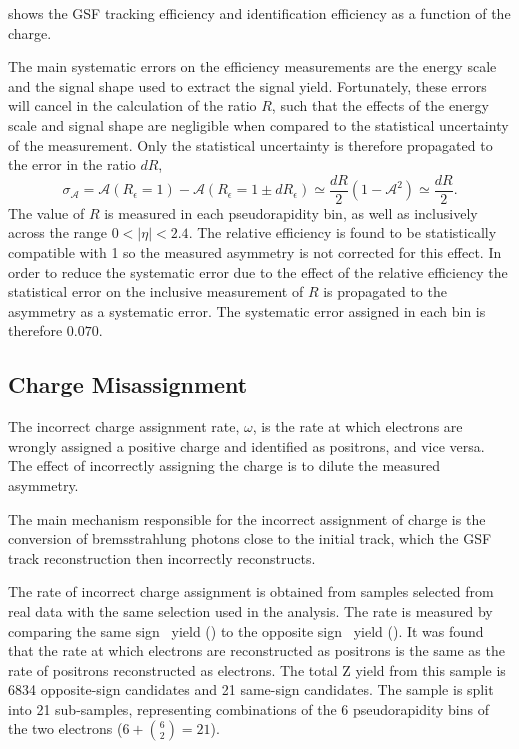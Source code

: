  shows the GSF tracking efficiency and identification 
efficiency as a function of the charge.


The main systematic errors on the efficiency measurements are the energy scale
and the signal shape used to extract the signal yield. Fortunately, these
errors will cancel in the calculation of the ratio $R$, such that the
effects of the energy scale and signal shape are negligible
when compared to the statistical uncertainty of the measurement. Only the
statistical uncertainty is therefore propagated to the error in the ratio
$dR$,
\begin{equation}
  \label{eq:releff}
  \sigma_{\mathcal{A}} 
  = \mathcal{A}(R_\epsilon=1) - \mathcal{A}(R_\epsilon=1\pm dR_\epsilon)  
  \simeq \frac{dR}{2}(1-\mathcal{A}^2)
  \simeq \frac{dR}{2} .
\end{equation}
The value of $R$ is measured in each pseudorapidity bin, as well as inclusively
across the range $0<| \eta |< 2.4$. 
The relative efficiency is found to be statistically compatible with 1 so the
measured asymmetry is not corrected for this effect.
In order to reduce the systematic error due to the effect of the relative
efficiency the statistical error on the inclusive measurement of $R$ is
propagated to the asymmetry as a systematic error. The systematic error assigned
in each bin is therefore $0.070$.

\subsection{Charge Misassignment}

The incorrect charge assignment rate, $\omega$, is the rate at which electrons are
wrongly assigned a positive charge and identified as positrons, and vice versa.
The effect of incorrectly assigning the charge is to dilute the measured
asymmetry.

The main mechanism responsible for the incorrect assignment of charge is the
conversion of bremsstrahlung photons close to the initial track, which the GSF
track reconstruction then incorrectly reconstructs.

The rate of incorrect charge assignment is obtained from \Zee samples selected from
real data  with the same selection used in the analysis. 
The rate is measured by comparing the
same sign \PZ\ yield (\HepProcess{\PZ\to\Pepm\Pepm}) to the opposite sign \PZ\
yield (\HepProcess{\PZ\to\Pelectron\APelectron}).
It was found that the rate at which electrons are reconstructed as positrons is
the same as the rate of positrons reconstructed as electrons.\todo{can I say
that with only 21 events!?}
The total Z yield from this sample is 6834 opposite-sign \PZ candidates and 21
same-sign \PZ candidates.
The sample is split into 21 sub-samples, representing
combinations of the 6 pseudorapidity bins of the two electrons ($6+\binom{6}{2} =
21$).

